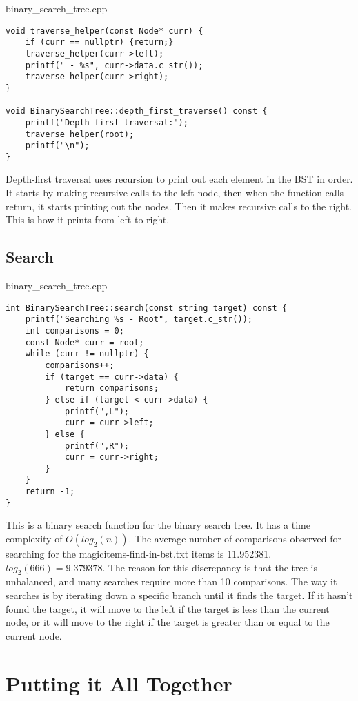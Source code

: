 \documentclass[letterpaper, 10pt,DIV=13]{scrartcl}
\numberwithin{equation}{section} %
\numberwithin{figure}{section} %
\numberwithin{table}{section} %
\begin{document}
binary\_search\_tree.cpp
\begin{verbatim}
void traverse_helper(const Node* curr) {
    if (curr == nullptr) {return;}
    traverse_helper(curr->left);
    printf(" - %s", curr->data.c_str());
    traverse_helper(curr->right);
}

void BinarySearchTree::depth_first_traverse() const {
    printf("Depth-first traversal:");
    traverse_helper(root);
    printf("\n");
}
\end{verbatim}

Depth-first traversal uses recursion to print out each element in the BST in order. It starts by making
recursive calls to the left node, then when the function calls return, it starts printing out the nodes.
Then it makes recursive calls to the right. This is how it prints from left to right.

\subsection{Search}

binary\_search\_tree.cpp
\begin{verbatim}
int BinarySearchTree::search(const string target) const {
    printf("Searching %s - Root", target.c_str());
    int comparisons = 0;
    const Node* curr = root;
    while (curr != nullptr) {
        comparisons++;
        if (target == curr->data) {
            return comparisons;
        } else if (target < curr->data) {
            printf(",L");
            curr = curr->left;
        } else {
            printf(",R");
            curr = curr->right;
        }
    }
    return -1;
}
\end{verbatim}

This is a binary search function for the binary search tree. It has a time complexity of $O(log_2(n))$.
The average number of comparisons observed for searching for the magicitems-find-in-bst.txt items is
11.952381. $log_2(666)=9.379378$. The reason for this discrepancy is that the tree is unbalanced, and many
searches require more than 10 comparisons. The way it searches is by iterating down a specific branch until
it finds the target. If it hasn't found the target, it will move to the left if the target is less than the
current node, or it will move to the right if the target is greater than or equal to the current node.

\section{Putting it All Together}
\end{document}
